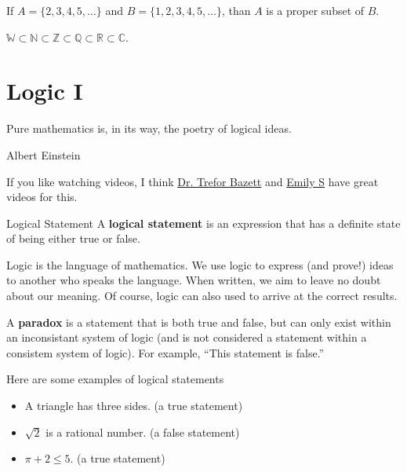\begin{boxexample}{}{}
	If $A=\{2,3,4,5,\dots\}$ and $B=\{1,2,3,4,5,\dots\}$, than $A$ is a proper subset of $B$.
\end{boxexample}

\begin{boxexample}{}{}
	$\mathbb{W} \subset \mathbb{N} \subset \mathbb{Z} \subset \mathbb{Q} \subset \mathbb{R} \subset \mathbb{C}$.
\end{boxexample}

\chapter{Logic I}

\epigraph{Pure mathematics is, in its way, the poetry of logical ideas.}{Albert Einstein}

If you like watching videos, I think \href{https://www.youtube.com/watch?v=SrU9YDoXE88}{Dr. Trefor Bazett} and \href{https://www.youtube.com/watch?v=wRMC-ttjhwM}{Emily S} have great videos for this.

\begin{boxdefine}{Logical Statement}{}
A {\bf logical statement} is an expression that has a definite state of being either true or false.
\end{boxdefine}

Logic is the language of mathematics. We use logic to express (and prove!) ideas to another who speaks the language. When written, we aim to leave no doubt about our meaning. Of course, logic can also used to arrive at the correct results.

\begin{boxremark*}{}{}
	A {\bf paradox} is a statement that is both true and false, but can only exist within an inconsistant system of logic (and is not considered a statement within a consistem system of logic). For example, ``This statement is false.''
\end{boxremark*}

\begin{boxexample}{}{}
	Here are some examples of logical statements
	\begin{itemize}
		\item A triangle has three sides. (a true statement)
		\item $\sqrt 2$ is a rational number. (a false statement)
		\item $\pi + 2 \leq 5$. (a true statement)
	\end{itemize}
\end{boxexample}

